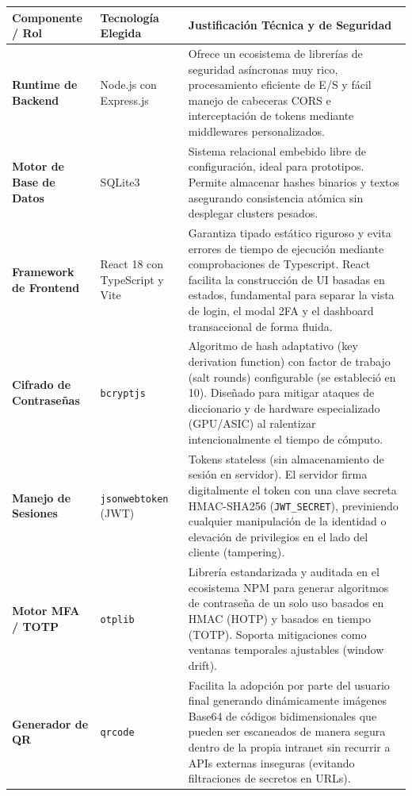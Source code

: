 \documentclass[12pt,a4paper]{article}
\begin{document}
\begin{table}[H]
    \centering
    \renewcommand{\arraystretch}{1.5}
    \begin{tabularx}{\textwidth}{@{} l >{\raggedright\arraybackslash}X >{\raggedright\arraybackslash}X @{}}
        \toprule
        \textbf{Componente / Rol} & \textbf{Tecnología Elegida} & \textbf{Justificación Técnica y de Seguridad} \\
        \midrule
        \textbf{Runtime de Backend} & Node.js con Express.js & Ofrece un ecosistema de librerías de seguridad asíncronas muy rico, procesamiento eficiente de E/S y fácil manejo de cabeceras CORS e interceptación de tokens mediante middlewares personalizados. \\
        \textbf{Motor de Base de Datos} & SQLite3 & Sistema relacional embebido libre de configuración, ideal para prototipos. Permite almacenar hashes binarios y textos asegurando consistencia atómica sin desplegar clusters pesados. \\
        \textbf{Framework de Frontend} & React 18 con TypeScript y Vite & Garantiza tipado estático riguroso y evita errores de tiempo de ejecución mediante comprobaciones de Typescript. React facilita la construcción de UI basadas en estados, fundamental para separar la vista de login, el modal 2FA y el dashboard transaccional de forma fluida. \\
        \textbf{Cifrado de Contraseñas} & \texttt{bcryptjs} & Algoritmo de hash adaptativo (key derivation function) con factor de trabajo (salt rounds) configurable (se estableció en 10). Diseñado para mitigar ataques de diccionario y de hardware especializado (GPU/ASIC) al ralentizar intencionalmente el tiempo de cómputo. \\
        \textbf{Manejo de Sesiones} & \texttt{jsonwebtoken} (JWT) & Tokens stateless (sin almacenamiento de sesión en servidor). El servidor firma digitalmente el token con una clave secreta HMAC-SHA256 (\texttt{JWT\_SECRET}), previniendo cualquier manipulación de la identidad o elevación de privilegios en el lado del cliente (tampering). \\
        \textbf{Motor MFA / TOTP} & \texttt{otplib} & Librería estandarizada y auditada en el ecosistema NPM para generar algoritmos de contraseña de un solo uso basados en HMAC (HOTP) y basados en tiempo (TOTP). Soporta mitigaciones como ventanas temporales ajustables (window drift). \\
        \textbf{Generador de QR} & \texttt{qrcode} & Facilita la adopción por parte del usuario final generando dinámicamente imágenes Base64 de códigos bidimensionales que pueden ser escaneados de manera segura dentro de la propia intranet sin recurrir a APIs externas inseguras (evitando filtraciones de secretos en URLs). \\

\end{tabularx}
\end{table}
\end{document}
